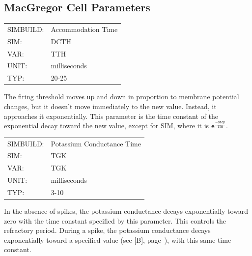 \documentclass[12pt,openany,oneside]{book}
\newcommand{\tmcode}[1]{\mathtt{#1}}
\newcommand{\tipxref}[1]{see [#1], page~\pageref{#1}}
\begin{document}
\vspace{\fill}

\subsection{MacGregor Cell Parameters}
\label{MacGregor Parameters}

\label{TTH}
\begin{flushleft}
\begin{tabular}{@{}ll@{}}
SIMBUILD:  &  Accommodation Time\\
SIM:  &  DCTH\\
VAR:  &  TTH\\
UNIT:  &  milliseconds\\
TYP:  &  20-{}25\\
\end{tabular}
\end{flushleft}

\noindent
The firing threshold moves up and down in proportion to membrane
potential changes, but it doesn't move immediately to the new value.
Instead, it approaches it exponentially. This parameter is the time
constant of the exponential decay toward the new value, except for
SIM, where it is $\tmcode{e^{\tfrac{-step}{TTH}}}$.
\filbreak
\vspace{\baselineskip}

\label{TGK}
\begin{flushleft}
\begin{tabular}{@{}ll@{}}
SIMBUILD:  &  Potassium Conductance Time\\
SIM:  &  TGK\\
VAR:  &  TGK\\
UNIT:  &  milliseconds\\
TYP:  &  3-10\\
\end{tabular}
\end{flushleft}

\noindent
In the absence of spikes, the potassium conductance decays
exponentially toward zero with the time constant specified by this
parameter. This controls the refractory period. During a spike, the
potassium conductance decays exponentially toward a specified value
(\tipxref{B}), with this same time constant.
\filbreak
\vspace{\baselineskip}
\end{document}
